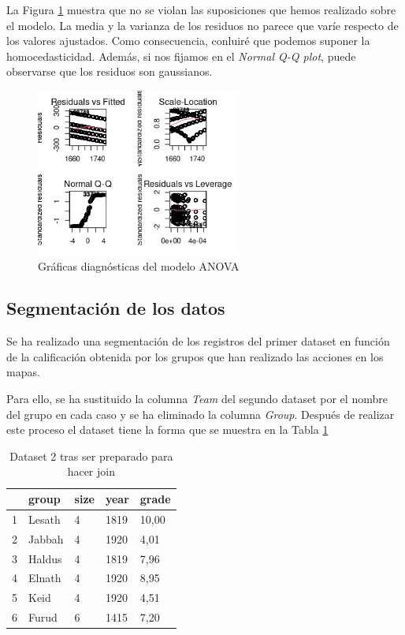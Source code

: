 
La Figura \ref{fig:suposiciones} muestra que no se violan las suposiciones que hemos realizado sobre el modelo. La media y la varianza de los residuos no parece que varíe respecto de los valores ajustados. Como consecuencia, conluiré que podemos suponer la homocedasticidad. Además, si nos fijamos en el \emph{Normal Q-Q plot}, puede observarse que los residuos son gaussianos.

\begin{figure}[h]
    \centering
    \includegraphics[width=0.60\textwidth]{imagenes/Rplot07.png}
    \caption{Gráficas diagnósticas del modelo ANOVA}
    \label{fig:suposiciones}
\end{figure}

\subsection{Segmentación de los datos}

Se ha realizado una segmentación de los registros del primer dataset en función de la calificación obtenida por los grupos que han realizado las acciones en los mapas.

Para ello, se ha sustituido la columna \emph{Team} del segundo dataset por el nombre del grupo en cada caso y se ha eliminado la columna \emph{Group}. Después de realizar este proceso el dataset tiene la forma que se muestra en la Tabla \ref{table:8}

\begin{table}[ht]
\centering
\begin{tabular}{rllll}
  \hline
 & group & size & year & grade \\ 
  \hline
1 & Lesath & 4 & 1819 & 10,00 \\ 
  2 & Jabbah & 4 & 1920 & 4,01 \\ 
  3 & Haldus & 4 & 1819 & 7,96 \\ 
  4 & Elnath & 4 & 1920 & 8,95 \\ 
  5 & Keid & 4 & 1920 & 4,51 \\ 
  6 & Furud & 6 & 1415 & 7,20 \\ 
   \hline
\end{tabular}
\caption{Dataset 2 tras ser preparado para hacer join}
\label{table:8}
\end{table}

